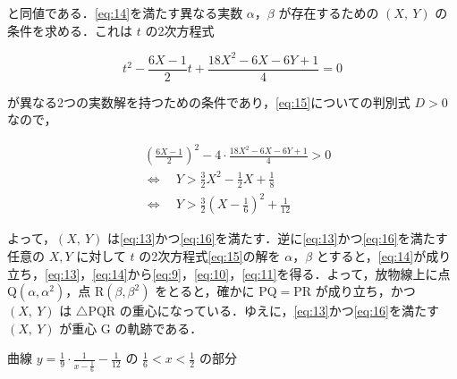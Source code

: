 \documentclass[a4paper]{ltjsarticle}
\begin{document}
と同値である．\eqref{eq:14}を満たす異なる実数 $\alpha$，$\beta$ が存在するための $(X,\ Y)$ の条件を求める．これは $t$ の2次方程式

\begin{equation}
    t^2-\frac{6X-1}{2}t+\frac{18X^2-6X-6Y+1}{4}=0\label{eq:15}
\end{equation}

が異なる2つの実数解を持つための条件であり，\eqref{eq:15}についての判別式 $D>0$ なので，

\begin{align}
     & \left(\frac{6X-1}{2}\right)^2-4\cdot\frac{18X^2-6X-6Y+1}{4}>0\nonumber                       \\
     & \Longleftrightarrow\quad Y>\frac{3}{2}X^2-\frac{1}{2}X+\frac{1}{8}\nonumber                  \\
     & \Longleftrightarrow\quad Y>\frac{3}{2}\left(X-\frac{1}{6}\right)^2+\frac{1}{12}\label{eq:16}
\end{align}

よって，$(X,\ Y)$ は\eqref{eq:13}かつ\eqref{eq:16}を満たす．逆に\eqref{eq:13}かつ\eqref{eq:16}を満たす任意の $X, Y$ に対して $t$ の2次方程式\eqref{eq:15}の解を $\alpha$，$\beta$ とすると，\eqref{eq:14}が成り立ち，\eqref{eq:13}，\eqref{eq:14}から\eqref{eq:9}，\eqref{eq:10}，\eqref{eq:11}を得る．よって，放物線上に点 Q$(\alpha,\alpha^2)$，点 R$(\beta,\beta^2)$ をとると，確かに PQ$=$PR が成り立ち，かつ $(X,\ Y)$ は $\triangle$PQR の重心になっている．ゆえに，\eqref{eq:13}かつ\eqref{eq:16}を満たす $(X,\ Y)$ が重心 G の軌跡である．

曲線 $y=\frac{1}{9}\cdot\frac{1}{x-\frac{1}{6}}-\frac{1}{12}$ の $\frac{1}{6}<x<\frac{1}{2}$ の部分

\end{document}
